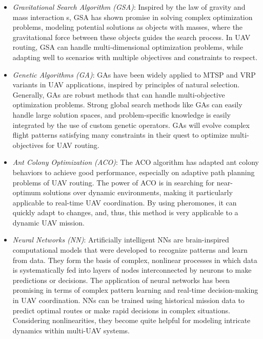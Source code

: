 \documentclass[conference]{IEEEtran}
\begin{document}
\begin{itemize}
    \item \textit{Gravitational Search Algorithm (GSA)}: Inspired by the law of gravity and mass interaction s, GSA has shown promise in solving complex optimization problems, modeling potential solutions as objects with masses, where the gravitational force between these objects guides the search process. In UAV routing, GSA can handle multi-dimensional optimization problems, while adapting well to scenarios with multiple objectives and constraints to respect.
    
    \item \textit{Genetic Algorithms (GA)}: GAs have been widely applied to MTSP and VRP variants in UAV applications, inspired by principles of natural selection. Generally, GAs are robust methods that can handle multi-objective optimization problems. Strong global search methods like GAs can easily handle large solution spaces, and problem-specific knowledge is easily integrated by the use of custom genetic operators. GAs will evolve complex flight patterns satisfying many constraints in their quest to optimize multi-objectives for UAV routing.
    
    \item \textit{Ant Colony Optimization (ACO)}: The ACO algorithm has adapted ant colony behaviors to achieve good performance, especially on adaptive path planning problems of UAV routing. The power of ACO is in searching for near-optimum solutions over dynamic environments, making it particularly applicable to real-time UAV coordination. By using pheromones, it can quickly adapt to changes, and, thus, this method is very applicable to a dynamic UAV mission.
    
    \item \textit{Neural Networks (NN)}: Artificially intelligent NNs are brain-inspired computational models that were developed to recognize patterns and learn from data. They form the basis of complex, nonlinear processes in which data is systematically fed into layers of nodes interconnected by neurons to make predictions or decisions. The application of neural networks has been promising in terms of complex pattern learning and real-time decision-making in UAV coordination. NNs can be trained using historical mission data to predict optimal routes or make rapid decisions in complex situations. Considering nonlinearities, they become quite helpful for modeling intricate dynamics within multi-UAV systems.
\end{itemize}
\end{document}
